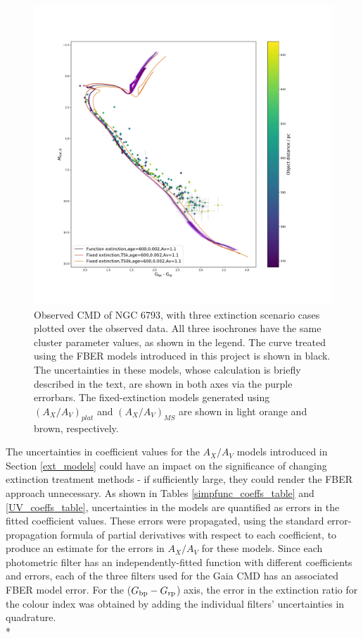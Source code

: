 \documentclass[12pt, a4paper]{report}
\begin{document}
\begin{figure}[h!]
\begin{center}
\includegraphics[width=1.0\textwidth]{../NGC_6793_CMD_Myr_model_err_vizier.pdf}
\caption{Observed CMD of NGC 6793, with three extinction scenario cases plotted over the observed data. All three isochrones have the same cluster parameter values, as shown in the legend. The curve treated using the FBER models introduced in this project is shown in black. The uncertainties in these models, whose calculation is briefly described in the text, are shown in both axes via the purple errorbars. The fixed-extinction models generated using $(A_{X}/A_{V})_{plat}$ and $(A_{X}/A_{V})_{MS}$ are shown in light orange and brown, respectively.}
\label{AxAv_model_err}
\end{center}
\end{figure}

The uncertainties in coefficient values for the $A_{X}/A_{V}$ models introduced in Section \ref{ext_models} could have an impact on the significance of changing extinction treatment methods - if sufficiently large, they could render the FBER approach unnecessary. As shown in Tables \ref{simpfunc_coeffs_table} and \ref{UV_coeffs_table}, uncertainties in the models are quantified as errors in the fitted coefficient values. These errors were propagated, using the standard error-propagation formula of partial derivatives with respect to each coefficient, to produce an estimate for the errors in $A_{X}/A_{V}$ for these models. Since each photometric filter has an independently-fitted function with different coefficients and errors, each of the three filters used for the Gaia CMD has an associated FBER model error. For the ($G_{\textnormal{bp}}-G_{\textnormal{rp}}$) axis, the error in the extinction ratio for the colour index was obtained by adding the individual filters' uncertainties in quadrature.\\*
\end{document}
